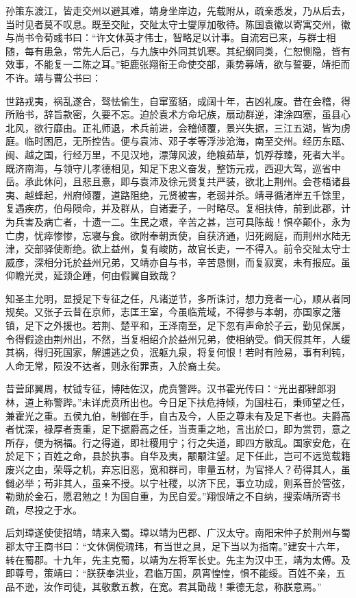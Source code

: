 \documentclass[12pt,UTF8]{ctexbook}
\begin{document}
孙策东渡江，皆走交州以避其难，靖身坐岸边，先载附从，疏亲悉发，乃从后去，当时见者莫不叹息。既至交阯，交阯太守士燮厚加敬待。陈国袁徽以寄寓交州，徽与尚书令荀彧书曰：“许文休英才伟士，智略足以计事。自流宕已来，与群士相随，每有患急，常先人后己，与九族中外同其饥寒。其纪纲同类，仁恕恻隐，皆有效事，不能复一二陈之耳。”钜鹿张翔衔王命使交部，乘势募靖，欲与誓要，靖拒而不许。靖与曹公书曰：

世路戎夷，祸乱遂合，驽怯偷生，自窜蛮貊，成阔十年，吉凶礼废。昔在会稽，得所贻书，辞旨款密，久要不忘。迫於袁术方命圮族，扇动群逆，津涂四塞，虽县心北风，欲行靡由。正礼师退，术兵前进，会稽倾覆，景兴失据，三江五湖，皆为虏庭。临时困厄，无所控告。便与袁沛、邓子孝等浮涉沧海，南至交州。经历东瓯、闽、越之国，行经万里，不见汉地，漂薄风波，绝粮茹草，饥殍荐臻，死者大半。既济南海，与领守儿孝德相见，知足下忠义奋发，整饬元戎，西迎大驾，巡省中岳。承此休问，且悲且憙，即与袁沛及徐元贤复共严装，欲北上荆州。会苍梧诸县夷、越蜂起，州府倾覆，道路阻绝，元贤被害，老弱并杀。靖寻循渚岸五千馀里，复遇疾疠，伯母陨命，并及群从，自诸妻子，一时略尽。复相扶侍，前到此郡，计为兵害及病亡者，十遗一二。生民之艰，辛苦之甚，岂可具陈哉！惧卒颠仆，永为亡虏，忧瘁惨惨，忘寝与食。欲附奉朝贡使，自获济通，归死阙庭，而荆州水陆无津，交部驿使断绝。欲上益州，复有峻防，故官长吏，一不得入。前令交阯太守士威彦，深相分讬於益州兄弟，又靖亦自与书，辛苦恳恻，而复寂寞，未有报应。虽仰瞻光灵，延颈企踵，何由假翼自致哉？

知圣主允明，显授足下专征之任，凡诸逆节，多所诛讨，想力竞者一心，顺从者同规矣。又张子云昔在京师，志匡王室，今虽临荒域，不得参与本朝，亦国家之藩镇，足下之外援也。若荆、楚平和，王泽南至，足下忽有声命於子云，勤见保属，令得假途由荆州出，不然，当复相绍介於益州兄弟，使相纳受。倘天假其年，人缓其祸，得归死国家，解逋逃之负，泯躯九泉，将复何恨！若时有险易，事有利钝，人命无常，陨没不达者，则永衔罪责，入於裔土矣。

昔营邱翼周，杖钺专征，博陆佐汉，虎贲警跸。汉书霍光传曰：“光出都肄郎羽林，道上称警跸。”未详虎贲所出也。今日足下扶危持倾，为国柱石，秉师望之任，兼霍光之重。五侯九伯，制御在手，自古及今，人臣之尊未有及足下者也。夫爵高者忧深，禄厚者责重，足下据爵高之任，当责重之地，言出於口，即为赏罚，意之所存，便为祸福。行之得道，即社稷用宁；行之失道，即四方散乱。国家安危，在於足下；百姓之命，县於执事。自华及夷，颙颙注望。足下任此，岂可不远览载籍废兴之由，荣辱之机，弃忘旧恶，宽和群司，审量五材，为官择人？苟得其人，虽雠必举；苟非其人，虽亲不授。以宁社稷，以济下民，事立功成，则系音於管弦，勒勋於金石，愿君勉之！为国自重，为民自爱。”翔恨靖之不自纳，搜索靖所寄书疏，尽投之于水。

后刘璋遂使使招靖，靖来入蜀。璋以靖为巴郡、广汉太守。南阳宋仲子於荆州与蜀郡太守王商书曰：“文休倜傥瑰玮，有当世之具，足下当以为指南。”建安十六年，转在蜀郡。十九年，先主克蜀，以靖为左将军长史。先主为汉中王，靖为太傅。及即尊号，策靖曰：“朕获奉洪业，君临万国，夙宵惶惶，惧不能绥。百姓不亲，五品不逊，汝作司徒，其敬敷五教，在宽。君其勖哉！秉德无怠，称朕意焉。”
\end{document}
